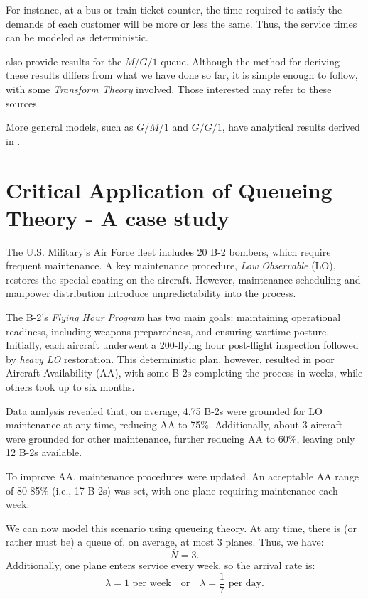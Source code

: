 \documentclass[11pt, a4paper]{report}
\begin{document}
For instance, at a bus or train ticket counter, the time required to satisfy the demands of each customer will be more or less the same. Thus, the service times can be modeled as deterministic.

\cite{RobertazziQ,myReference} also provide results for the $M/G/1$ queue. Although the method for deriving these results differs from what we have done so far, it is simple enough to follow, with some \emph{Transform Theory} involved. Those interested may refer to these sources.

More general models, such as $G/M/1$ and $G/G/1$, have analytical results derived in \cite{10.1214/aoms/1177728975,kleinrock1974queueing}.

\section{Critical Application of Queueing Theory - A case study}
The U.S. Military’s Air Force fleet includes 20 B-2 bombers, which require frequent maintenance. A key maintenance procedure, \emph{Low Observable} (LO), restores the special coating on the aircraft. However, maintenance scheduling and manpower distribution introduce unpredictability into the process.

The B-2’s \emph{Flying Hour Program} has two main goals: maintaining operational readiness, including weapons preparedness, and ensuring wartime posture. Initially, each aircraft underwent a 200-flying hour post-flight inspection followed by \emph{heavy LO} restoration. This deterministic plan, however, resulted in poor Aircraft Availability (AA), with some B-2s completing the process in weeks, while others took up to six months.

Data analysis revealed that, on average, 4.75 B-2s were grounded for LO maintenance at any time, reducing AA to 75\%. Additionally, about 3 aircraft were grounded for other maintenance, further reducing AA to 60\%, leaving only 12 B-2s available.

To improve AA, maintenance procedures were updated. An acceptable AA range of 80-85\% (i.e., 17 B-2s) was set, with one plane requiring maintenance each week.


We can now model this scenario using queueing theory. At any time, there is (or rather must be) a queue of, on average, at most 3 planes. Thus, we have:
\[
\bar{N} = 3.
\]
Additionally, one plane enters service every week, so the arrival rate is:
\[
\lambda = 1 \text{ per week} \quad \text{or} \quad \lambda = \frac{1}{7} \text{ per day}.
\]
\end{document}
